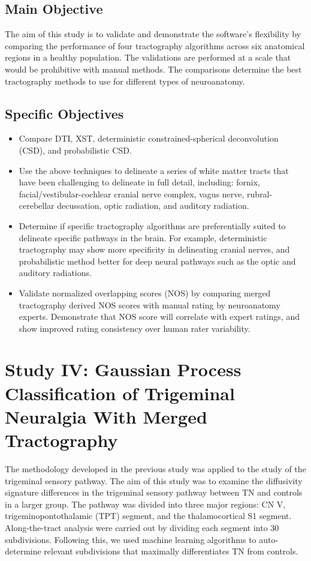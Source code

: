 \subsection{Main Objective}
The aim of this study is to validate and demonstrate the software's flexibility by comparing the performance of four tractography algorithms across six anatomical regions in a healthy population. The validations are performed  at a scale that would be prohibitive with manual methods. The comparisons determine the best tractography methods to use for different types of neuroanatomy.

\subsection{Specific Objectives}
\begin{itemize}
    \item Compare DTI, XST, deterministic constrained-spherical deconvolution (CSD), and probabilistic CSD. 
    
    \item Use the above techniques to delineate a series of white matter tracts that have been challenging to delineate in full detail, including: fornix, facial/vestibular-cochlear cranial nerve complex, vagus nerve, rubral-cerebellar decussation, optic radiation, and auditory radiation.
    
    \item Determine if specific tractography algorithms are preferentially suited to delineate specific pathways in the brain. For example, deterministic tractography may show more specificity in delineating cranial nerves, and probabilistic method better for deep neural pathways such as the optic and auditory radiations.
    
    \item Validate normalized overlapping scores (NOS) by comparing merged tractography derived NOS scores with manual rating by neuroanatomy experts. Demonstrate that NOS score will correlate with expert ratings, and show improved rating consistency over human rater variability.

\end{itemize}

\section[Study IV]{Study IV: Gaussian Process Classification of Trigeminal Neuralgia With Merged Tractography}
The methodology developed in the previous study was applied to the study of the trigeminal sensory pathway. The aim of this study was to examine the diffusivity signature differences in the trigeminal sensory pathway between TN and controls in a larger group. The pathway was divided into three major regions: CN V, trigeminopontothalamic (TPT) segment, and the thalamocortical S1 segment. Along-the-tract analysis were carried out by dividing each segment into 30 subdivisions. Following this, we used machine learning algorithms to auto-determine relevant subdivisions that maximally differentiates TN from controls.

